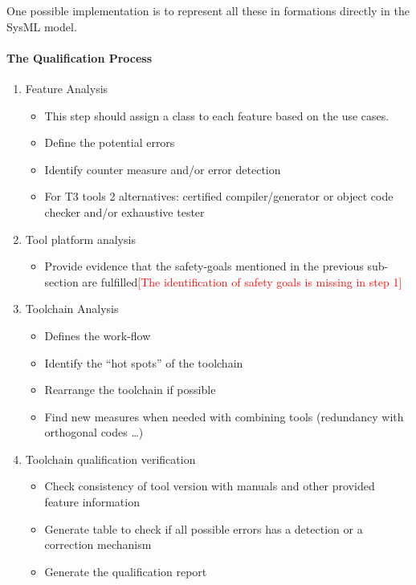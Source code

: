 One possible implementation is to represent all these in formations
directly in the SysML model.

\paragraph{The Qualification Process}

\begin{enumerate}
\item Feature Analysis
  \begin{itemize}
  \item This step should assign a class to each feature based on the use cases.
  \item Define the potential errors
  \item Identify counter measure and/or error detection
  \item For T3 tools 2 alternatives:  certified compiler/generator or
    object code checker and/or exhaustive tester
  \end{itemize}
\item Tool platform  analysis 
  \begin{itemize}
  \item Provide evidence that the safety-goals mentioned in the
    previous sub-section are fulfilled\textcolor{red}{[The identification of safety goals is missing in step 1]}
  \end{itemize}
\item Toolchain Analysis
  \begin{itemize}
  \item Defines the work-flow
  \item Identify the ``hot spots'' of the toolchain
  \item Rearrange the toolchain if possible
  \item Find new measures when needed with combining tools (redundancy with orthogonal
    codes \ldots{})
  \end{itemize}
\item Toolchain qualification verification 
  \begin{itemize}
  \item Check consistency of tool version with  manuals and other
    provided feature information
  \item Generate table to  check if all possible errors has a
    detection or a correction mechanism
\item Generate the qualification report
  \end{itemize}

\end{enumerate}







